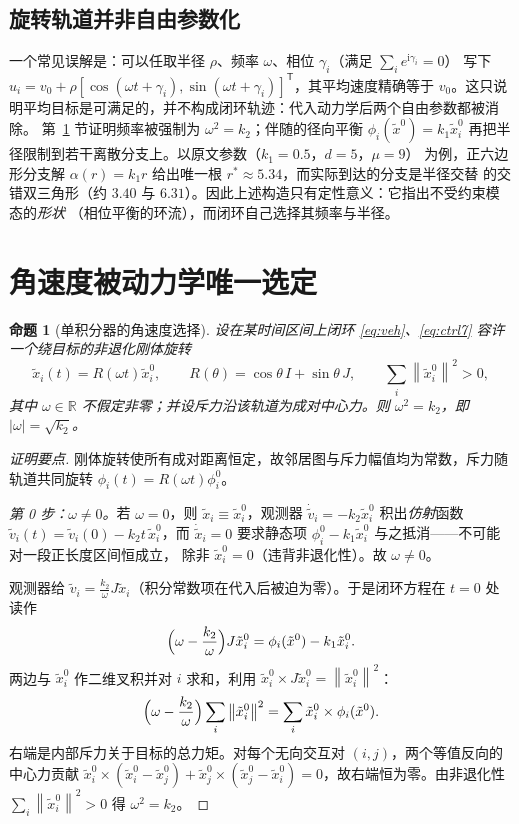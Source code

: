 \documentclass[11pt,a4paper]{ctexart}
\theoremstyle{plain}
\newtheorem{proposition}{命题}
\theoremstyle{definition}
\theoremstyle{remark}
\newcommand{\R}{\mathbb{R}}
\newcommand{\txi}{\tilde{x}}
\newcommand{\tv}{\tilde{v}}
\newcommand{\norm}[1]{\left\|#1\right\|}
\begin{document}
\subsection{旋转轨道并非自由参数化}
一个常见误解是：可以任取半径 $\rho$、频率 $\omega$、相位 $\gamma_i$（满足 $\sum_ie^{\mathrm i\gamma_i}=0$）
写下 $u_i=v_0+\rho[\cos(\omega t+\gamma_i),\sin(\omega t+\gamma_i)]^{\mathsf T}$，其平均速度精确等于
$v_0$。这只说明平均目标是可满足的，并不构成闭环轨迹：代入动力学后两个自由参数都被消除。
第~\ref{sec:omega} 节证明频率被强制为 $\omega^2=k_2$；伴随的径向平衡
$\phi_i(\txi^0)=k_1\txi_i^0$ 再把半径限制到若干离散分支上。以原文参数（$k_1=0.5$，$d=5$，$\mu=9$）
为例，正六边形分支解 $\alpha(r)=k_1r$ 给出唯一根 $r^*\approx5.34$，而实际到达的分支是半径交替
的交错双三角形（约 $3.40$ 与 $6.31$）。因此上述构造只有定性意义：它指出不受约束模态的\emph{形状}
（相位平衡的环流），而闭环自己选择其频率与半径。

\section{角速度被动力学唯一选定}
\label{sec:omega}

\begin{proposition}[单积分器的角速度选择]
\label{prop:omega}
设在某时间区间上闭环 \eqref{eq:veh}、\eqref{eq:ctrl7} 容许一个绕目标的非退化刚体旋转
\begin{equation}
  \txi_i(t)=R(\omega t)\txi_i^0,\qquad R(\theta)=\cos\theta\,I+\sin\theta\,J,\qquad
  \sum_i\norm{\txi_i^0}^2>0 ,
  \label{eq:rigid}
\end{equation}
其中 $\omega\in\R$ \emph{不}假定非零；并设斥力沿该轨道为成对中心力。则
$\omega^2=k_2$，即 $|\omega|=\sqrt{k_2}$。
\end{proposition}

\begin{proof}[证明要点]
刚体旋转使所有成对距离恒定，故邻居图与斥力幅值均为常数，斥力随轨道共同旋转
$\phi_i(t)=R(\omega t)\phi_i^0$。

\emph{第 0 步：$\omega\ne0$。}若 $\omega=0$，则 $\txi_i\equiv\txi_i^0$，观测器
$\dot\tv_i=-k_2\txi_i^0$ 积出\emph{仿射}函数 $\tv_i(t)=\tv_i(0)-k_2t\,\txi_i^0$，而
$\dot\txi_i=0$ 要求静态项 $\phi_i^0-k_1\txi_i^0$ 与之抵消——不可能对一段正长度区间恒成立，
除非 $\txi_i^0=0$（违背非退化性）。故 $\omega\ne0$。

观测器给 $\tv_i=\frac{k_2}{\omega}J\txi_i$（积分常数项在代入后被迫为零）。于是闭环方程在 $t=0$ 处读作
\begin{equation}
  \Bigl(\omega-\frac{k_2}{\omega}\Bigr)J\txi_i^0=\phi_i(\txi^0)-k_1\txi_i^0 .
  \label{eq:torq}
\end{equation}
两边与 $\txi_i^0$ 作二维叉积并对 $i$ 求和，利用 $\txi_i^0\times J\txi_i^0=\norm{\txi_i^0}^2$：
\begin{equation}
  \Bigl(\omega-\frac{k_2}{\omega}\Bigr)\sum_i\norm{\txi_i^0}^2=\sum_i\txi_i^0\times\phi_i(\txi^0).
  \label{eq:torqsum}
\end{equation}
右端是内部斥力关于目标的总力矩。对每个无向交互对 $(i,j)$，两个等值反向的中心力贡献
$\txi_i^0\times(\txi_i^0-\txi_j^0)+\txi_j^0\times(\txi_j^0-\txi_i^0)=0$，故右端恒为零。由非退化性
$\sum_i\norm{\txi_i^0}^2>0$ 得 $\omega^2=k_2$。
\end{proof}
\end{document}

